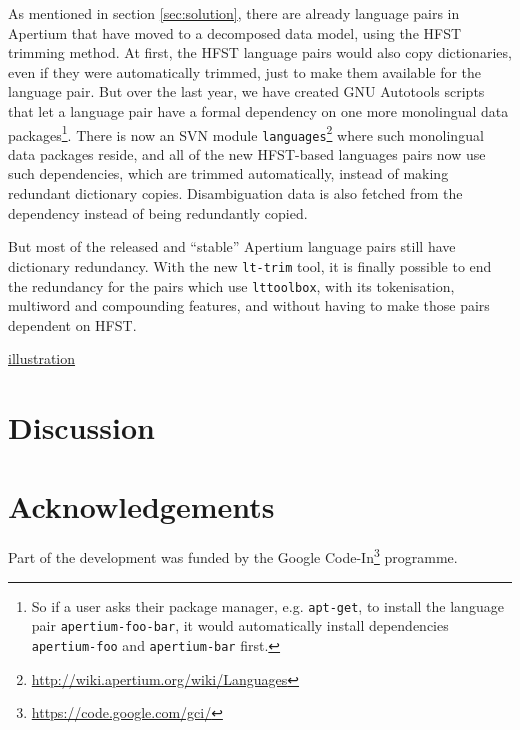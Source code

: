 \documentclass[10pt, a4paper]{article}
\newcommand{\tool}[1]{\texttt{#1}}
\begin{document}
As mentioned in section \ref{sec:solution}, there are already language
pairs in Apertium that have moved to a decomposed data model, using
the HFST trimming method. At first, the HFST language pairs would also
copy dictionaries, even if they were automatically trimmed, just to
make them available for the language pair.  But over the last year, we
have created GNU Autotools scripts that let a language pair have a
formal dependency on one more monolingual data packages\footnote{So if
    a user asks their package manager, e.g. \tool{apt-get}, to install
    the language pair \tool{apertium-foo-bar}, it would automatically
    install dependencies \tool{apertium-foo} and \tool{apertium-bar}
first.}. There is now an SVN module
\texttt{languages}\footnote{\href{http://wiki.apertium.org/wiki/Languages}{http://wiki.apertium.org/wiki/Languages}}
where such monolingual data packages reside, and all of the new
HFST-based languages pairs now use such dependencies, which are
trimmed automatically, instead of making redundant dictionary copies.
Disambiguation data is also fetched from the dependency instead of
being redundantly copied.

But most of the released and ``stable'' Apertium language pairs still
have dictionary redundancy.  With the new \tool{lt-trim} tool, it is
finally possible to end the redundancy for the pairs which use
\tool{lttoolbox}, with its tokenisation, multiword and compounding
features, and without having to make those pairs dependent on HFST.

\href{http://awwapp.com/draw.html#62731a1e}{illustration}

\section{Discussion}
\section*{Acknowledgements}
Part of the development was funded by the Google
Code-In\footnote{\href{https://code.google.com/gci/}{https://code.google.com/gci/}} programme.



\end{document}
